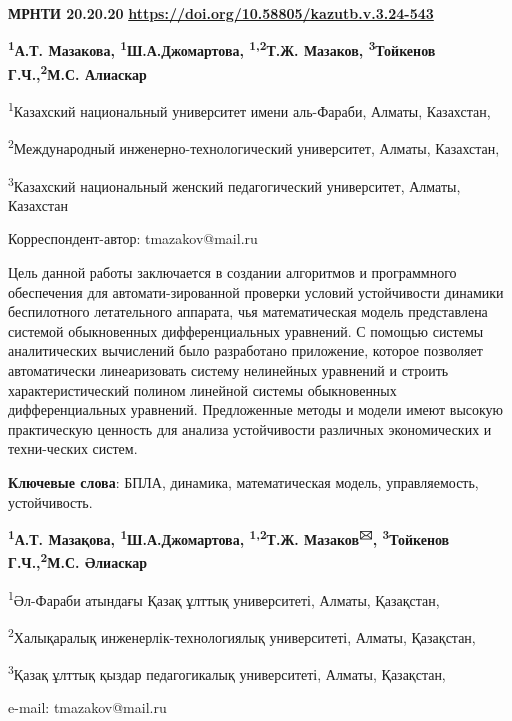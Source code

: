 \newpage
{\bfseries МРНТИ 20.20.20}
\hfill {\bfseries \href{https://doi.org/10.58805/kazutb.v.3.24-543}{https://doi.org/10.58805/kazutb.v.3.24-543}}


\begin{center}
{\bfseries \textsuperscript{1}А.Т. Мазакова,
\textsuperscript{1}Ш.А.Джомартова, \textsuperscript{1,2}Т.Ж.
Мазаков\envelope, \textsuperscript{3}Тойкенов Г.Ч.,\textsuperscript{2}М.С. Алиаскар}

\textsuperscript{1}Казахский национальный университет имени аль-Фараби,
Алматы, Казахстан,

\textsuperscript{2}Международный инженерно-технологический университет,
Алматы, Казахстан,

\textsuperscript{3}Казахский национальный женский педагогический
университет, Алматы, Казахстан
\end{center}
\envelope Корреспондент-автор: tmazakov@mail.ru \vspace{0.5cm}

Цель данной работы заключается в создании алгоритмов и программного
обеспечения для автомати-зированной проверки условий устойчивости
динамики беспилотного летательного аппарата, чья математическая модель
представлена системой обыкновенных дифференциальных уравнений. С помощью
системы аналитических вычислений было разработано приложение, которое
позволяет автоматически линеаризовать систему нелинейных уравнений и
строить характеристический полином линейной системы обыкновенных
дифференциальных уравнений. Предложенные методы и модели имеют высокую
практическую ценность для анализа устойчивости различных экономических и
техни-ческих систем.

{\bfseries Ключевые слова}: БПЛА, динамика, математическая модель,
управляемость, устойчивость.


\begin{center}
{\bfseries \textsuperscript{1}А.Т. Мазақова,
\textsuperscript{1}Ш.А.Джомартова, \textsuperscript{1,2}Т.Ж.
Мазаков\textsuperscript{🖂}, \textsuperscript{3}Тойкенов Г.Ч.,\textsuperscript{2}М.С. Әлиаскар}

\textsuperscript{1}Әл-Фараби атындағы Қазақ ұлттық университеті, Алматы,
Қазақстан,

\textsuperscript{2}Халықаралық инженерлік-технологиялық университеті,
Алматы, Қазақстан,

\textsuperscript{3}Қазақ ұлттық қыздар педагогикалық университеті,
Алматы, Қазақстан,

e-mail: tmazakov@mail.ru
\end{center}

